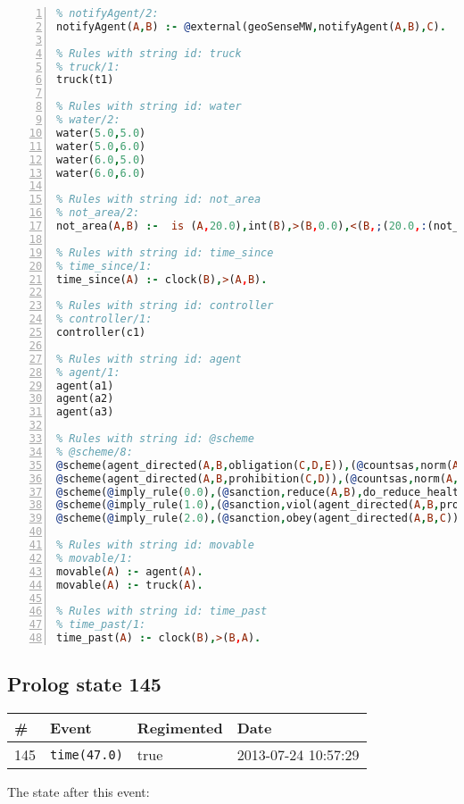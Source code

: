 \documentclass[11pt]{article}\usepackage[utf8]{inputenc}\usepackage{geometry}
\begin{document}
\begin{lstlisting}[language=Prolog, numbers=left]
% Rules with string id: notifyAgent
% notifyAgent/2:
notifyAgent(A,B) :- @external(geoSenseMW,notifyAgent(A,B),C).

% Rules with string id: truck
% truck/1:
truck(t1)

% Rules with string id: water
% water/2:
water(5.0,5.0)
water(5.0,6.0)
water(6.0,5.0)
water(6.0,6.0)

% Rules with string id: not_area
% not_area/2:
not_area(A,B) :-  is (A,20.0),int(B),>(B,0.0),<(B,;(20.0,:(not_area(A,B), is (-(B),20.0)))),int(A),>(A,0.0),<(A,;(20.0,:(area(A,B),-(int(A))))),int(B),>(A,0.0),>(B,0.0),<(A,21.0),<(B,21.0).

% Rules with string id: time_since
% time_since/1:
time_since(A) :- clock(B),>(A,B).

% Rules with string id: controller
% controller/1:
controller(c1)

% Rules with string id: agent
% agent/1:
agent(a1)
agent(a2)
agent(a3)

% Rules with string id: @scheme
% @scheme/8:
@scheme(agent_directed(A,B,obligation(C,D,E)),(@countsas,norm(A,B,F,obligation(C,D,E)),F),false,(listTrue(C)),(time_past(D)),false,[plus(viol(agent_directed(A,B,obligation(C,D,E))))|[]],[plus(obey(agent_directed(A,B,obligation(C,D,E))))|[]])
@scheme(agent_directed(A,B,prohibition(C,D)),(@countsas,norm(A,B,E,prohibition(C,D)),E),(listTrue(C)),false,(false),false,[plus(viol(agent_directed(A,B,prohibition(C,D))))|[]],[plus(obey(agent_directed(A,B,prohibition(C,D))))|[]])
@scheme(@imply_rule(0.0),(@sanction,reduce(A,B),do_reduce_health(A,B),notifyAgent(A,changed(status))),true,false,false,false,[min(reduce(A,B))|[]],[])
@scheme(@imply_rule(1.0),(@sanction,viol(agent_directed(A,B,prohibition(C,D))),do_sanction(D)),true,false,false,false,[min(viol(agent_directed(A,B,prohibition(C,D))))|[]],[])
@scheme(@imply_rule(2.0),(@sanction,obey(agent_directed(A,B,C))),true,false,false,false,[min(obey(agent_directed(A,B,C)))|[]],[])

% Rules with string id: movable
% movable/1:
movable(A) :- agent(A).
movable(A) :- truck(A).

% Rules with string id: time_past
% time_past/1:
time_past(A) :- clock(B),>(B,A).

\end{lstlisting}
\clearpage 
\subsection{Prolog state 145}
\begin{table}[ht]
\centering 
\begin{tabular}{l l l l} 
\textbf{\#} & \textbf{Event} & \textbf{Regimented} & \textbf{Date} \\ [0.5ex] 
\hline
145&\texttt{time(47.0)}&true&2013-07-24 10:57:29\\ [1ex] \hline\end{tabular}
\end{table}
The state after this event:
\end{document}
